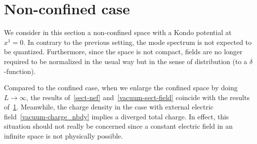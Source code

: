 \section{Non-confined case}\label{vacuum-without_bdy}
We consider in this section a non-confined space with a Kondo potential at $x^1 = 0$.
In contrary to the previous setting, the mode spectrum is not expected to be quantized.
Furthermore, since the space is not compact, fields are no longer required to be normalized in the usual way but in the sense of distribution (to a $\delta$-function).  

%
Compared to the confined case, when we enlarge the confined space by doing $L \rightarrow \infty$, 
the results of~\cref{sect-nef} and~\cref{vacuum-sect-field} coincide with the results of~\cref{vacuum-without_bdy}.
Meanwhile, the charge density in the case with external electric field~\cref{vacuum-charge_nbdy} implies a diverged total charge.
In effect, this situation should not really be concerned since a constant electric field in an infinite space is not physically possible.
